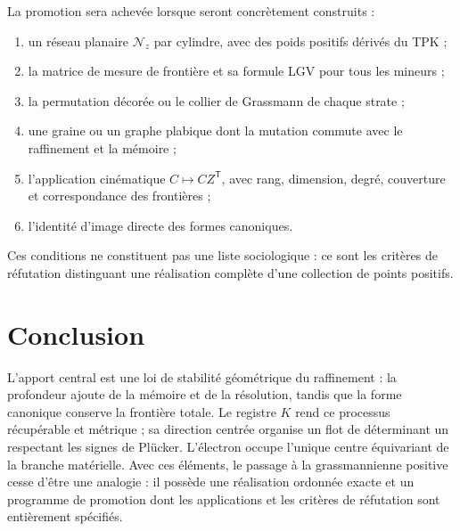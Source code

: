 La promotion sera achevée lorsque seront concrètement construits :
\begin{enumerate}
\item un réseau planaire \(\mathcal N_z\) par cylindre, avec des poids positifs dérivés du TPK ;
\item la matrice de mesure de frontière et sa formule LGV pour tous les mineurs ;
\item la permutation décorée ou le collier de Grassmann de chaque strate ;
\item une graine ou un graphe plabique dont la mutation commute avec le raffinement et la mémoire ;
\item l’application cinématique \(C\mapsto CZ^{\mathsf T}\), avec rang, dimension, degré, couverture et correspondance des frontières ;
\item l’identité d’image directe des formes canoniques.
\end{enumerate}
Ces conditions ne constituent pas une liste sociologique : ce sont les critères de réfutation distinguant une réalisation complète d’une collection de points positifs.

\section{Conclusion}

L’apport central est une loi de stabilité géométrique du raffinement : la profondeur ajoute de la mémoire et de la résolution, tandis que la forme canonique conserve la frontière totale. Le registre \(K\) rend ce processus récupérable et métrique ; sa direction centrée organise un flot de déterminant un respectant les signes de Plücker. L’électron occupe l’unique centre équivariant de la branche matérielle. Avec ces éléments, le passage à la grassmannienne positive cesse d’être une analogie : il possède une réalisation ordonnée exacte et un programme de promotion dont les applications et les critères de réfutation sont entièrement spécifiés.

